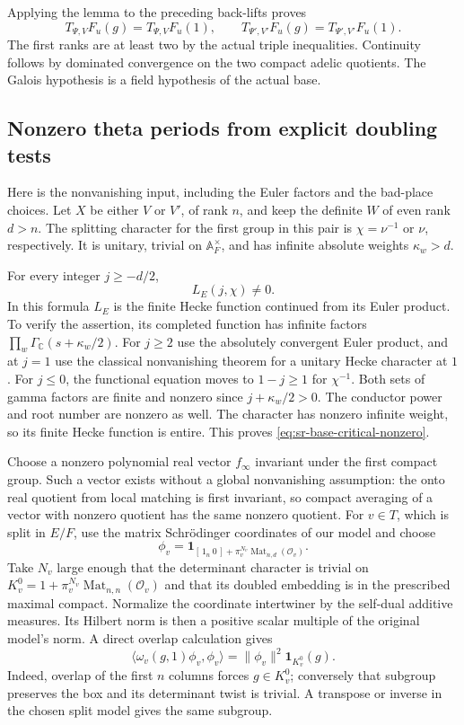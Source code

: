 Applying the lemma to the preceding back-lifts proves
\[
             T_{\Psi,V}F_u(g)=T_{\Psi,V}F_u(1),\qquad
             T_{\Psi',V'}F_u(g)=T_{\Psi',V'}F_u(1).
\tag{*}\label{eq:sr-base-backlift-constant}
\]
The first ranks are at least two by the actual triple
inequalities. Continuity follows by dominated convergence
on the two compact adelic quotients. The Galois hypothesis
is a field hypothesis of the actual base.

\subsection{Nonzero theta periods from explicit doubling tests}

Here is the nonvanishing input, including the Euler factors
and the bad-place choices. Let \(X\) be either \(V\) or \(V'\),
of rank \(n\), and keep the definite \(W\) of even rank \(d>n\).
The splitting character for the first group in this pair is
\(\chi=\nu^{-1}\) or \(\nu\), respectively.
It is unitary, trivial on \(\mathbb A_F^\times\), and has
infinite absolute weights \(\kappa_w>d\).

For every integer \(j\geq-d/2\),
\[
                            L_E(j,\chi)\ne0 .
\tag{**}\label{eq:sr-base-critical-nonzero}
\]
In this formula \(L_E\) is the finite Hecke function continued
from its Euler product. To verify the assertion, its completed
function has infinite factors
\(\prod_w\Gamma_{\mathbb C}(s+\kappa_w/2)\).
For \(j\geq2\) use the absolutely convergent Euler product,
and at \(j=1\) use the classical nonvanishing theorem for a
unitary Hecke character at \(1\). For \(j\leq0\), the functional
equation moves to \(1-j\geq1\) for \(\chi^{-1}\).
Both sets of gamma factors are finite and nonzero since
\(j+\kappa_w/2>0\). The conductor power and root number are
nonzero as well. The character has nonzero infinite weight,
so its finite Hecke function is entire. This proves
\eqref{eq:sr-base-critical-nonzero}.

Choose a nonzero polynomial real vector \(f_\infty\) invariant
under the first compact group. Such a vector exists without
a global nonvanishing assumption: the onto real quotient from
local matching is first invariant, so compact averaging of
a vector with nonzero quotient has the same nonzero quotient.
For \(v\in T\), which is split in \(E/F\), use the matrix
Schr\"odinger coordinates of our model and choose
\[
 \phi_v=\mathbf1_{[\,1_n\ 0\,]
                         +\pi_v^{N_v}\operatorname{Mat}_{n,d}
                                                   (\mathcal O_v)}.
\]
Take \(N_v\) large enough that the determinant character is
trivial on
\(K_v^0=1+\pi_v^{N_v}\operatorname{Mat}_{n,n}(\mathcal O_v)\)
and that its doubled embedding is in the prescribed maximal
compact. Normalize the coordinate intertwiner by the
self-dual additive measures. Its Hilbert norm is then a
positive scalar multiple of the original model's norm.
A direct overlap calculation gives
\[
 \langle\omega_v(g,1)\phi_v,\phi_v\rangle
            =\|\phi_v\|^2\mathbf1_{K_v^0}(g).
\]
Indeed, overlap of the first \(n\) columns forces
\(g\in K_v^0\); conversely that subgroup preserves the box
and its determinant twist is trivial. A transpose or inverse
in the chosen split model gives the same subgroup.


